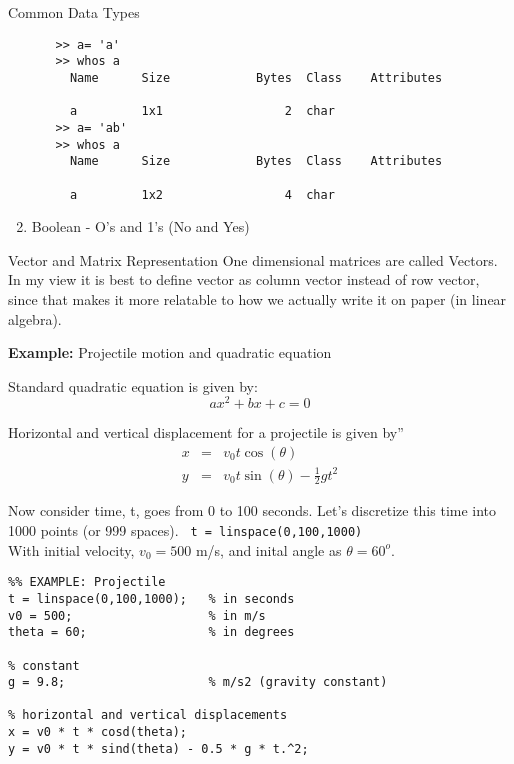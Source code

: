 \documentclass[11pt,titlepage,fleqn]{article}
\begin{document}
\begin{section}{Common Data Types}
\begin{enumerate}
\begin{enumerate}
\begin{verbatim}
>> a= 'a'
>> whos a
  Name      Size            Bytes  Class    Attributes

  a         1x1                 2  char  
>> a= 'ab'
>> whos a
  Name      Size            Bytes  Class    Attributes

  a         1x2                 4  char 
\end{verbatim}

\end{enumerate}
\item Boolean - O's and 1's (No and Yes)
\end{enumerate}
\end{section}

\begin{section}{Vector and Matrix Representation}
One dimensional matrices are called Vectors. In my view it is best to define vector as column vector instead of row vector, since that makes it more relatable to how we actually write it on paper (in linear algebra).

{\bf Example:} Projectile motion and quadratic equation

Standard quadratic equation is given by:
\begin{equation}
a x^2 +b x + c = 0 \label{quad}
\end{equation}

Horizontal and vertical displacement for a projectile is given by''
\begin{eqnarray}
x &=& v_0 t \cos(\theta)\\  \label{disp} 
y &=& v_0 t \sin(\theta) - \frac{1}{2} g t^2 
\end{eqnarray}

Now consider time, t, goes from 0 to 100 seconds. Let's discretize this time into 1000 points (or  999 spaces).
\verb+ t = linspace(0,100,1000)+ \\
With initial velocity, $v_0 = 500$ m/s, and inital angle as $\theta = 60^o$.

\begin{verbatim}
%% EXAMPLE: Projectile
t = linspace(0,100,1000);   % in seconds
v0 = 500;                   % in m/s
theta = 60;                 % in degrees

% constant
g = 9.8;                    % m/s2 (gravity constant)

% horizontal and vertical displacements
x = v0 * t * cosd(theta);
y = v0 * t * sind(theta) - 0.5 * g * t.^2;


\end{verbatim}
\end{section}
\end{document}
